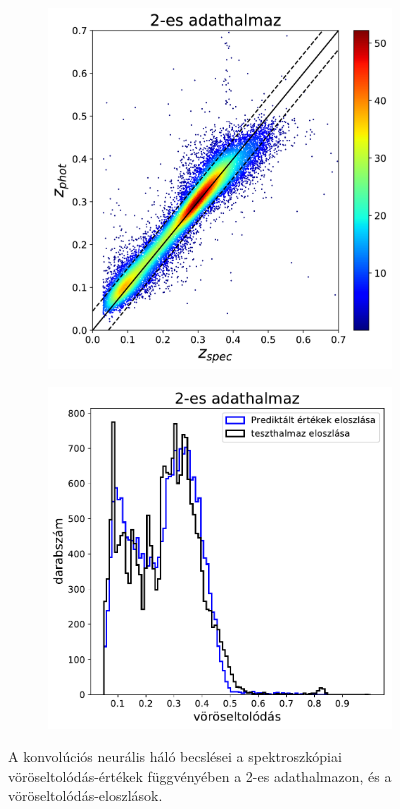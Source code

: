 \documentclass[12pt,letterpaper,oneside,openright]{book}
\begin{document}
\begin{figure}[h!]
 \centering
  \begin{subfigure}[b]{0.3\textwidth}
    \includegraphics[width=\textwidth, height = \textwidth]{Figures/plotCNN2.png}
    \label{fig:1}
  \end{subfigure}
  \hspace{1.7cm}
  \begin{subfigure}[b]{0.3\textwidth}
    \includegraphics[width=\textwidth, height = \textwidth]{Figures/histCNN2.pdf}
    \label{fig:2}
  \end{subfigure}
  \caption{A konvolúciós neurális háló becslései a spektroszkópiai vöröseltolódás-értékek függvényében a 2-es adathalmazon, és a vöröseltolódás-eloszlások.}
\label{cnn}
\end{figure}
\end{document}
